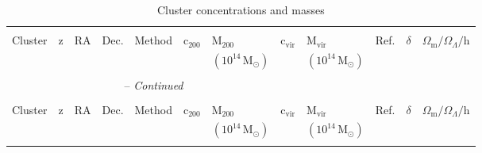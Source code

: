 

\onecolumn
\begin{landscape}
\begin{center}
{\tiny \begin{longtable}{llllllllllll}
\caption{{\normalsize Cluster concentrations and masses}} \\
\hline \hline \\[-2ex]
   \multicolumn{1}{l}{Cluster} &
   \multicolumn{1}{l}{$\mathrm{z}$} &
   \multicolumn{1}{l}{$\mathrm{RA}$} &
   \multicolumn{1}{l}{$\mathrm{Dec.}$} &
   \multicolumn{1}{l}{Method} &
   \multicolumn{1}{l}{$\mathrm{c}_{200}$} &
   \multicolumn{1}{l}{$\mathrm{M}_{200}$} &
   \multicolumn{1}{l}{$\mathrm{c}_\mathrm{vir}$} &
   \multicolumn{1}{l}{$\mathrm{M}_\mathrm{vir}$} &
   \multicolumn{1}{l}{Ref.} &
   \multicolumn{1}{l}{$\delta$} &
   \multicolumn{1}{l}{$\Omega_{\mathrm{m}} / \Omega_{\Lambda} / \mathrm{h}$} \\
                               & & & & & &
\multicolumn{1}{l}{$(10^{14} \, \mathrm{M}_\odot)$} & &
\multicolumn{1}{l}{$(10^{14} \, \mathrm{M}_\odot)$} \\ [0.5ex] \hline
   \\[-1.8ex]
\endfirsthead
\multicolumn{8}{c}{{\tablename} \thetable{} -- {\it Continued}} \\[0.5ex]
  \hline \hline \\[-2ex]
   \multicolumn{1}{l}{Cluster} &
   \multicolumn{1}{l}{$\mathrm{z}$} &
   \multicolumn{1}{l}{$\mathrm{RA}$} &
   \multicolumn{1}{l}{$\mathrm{Dec.}$} &
   \multicolumn{1}{l}{Method} &
   \multicolumn{1}{l}{$\mathrm{c}_{200}$} &
   \multicolumn{1}{l}{$\mathrm{M}_{200}$} &
   \multicolumn{1}{l}{$\mathrm{c}_\mathrm{vir}$} &
   \multicolumn{1}{l}{$\mathrm{M}_\mathrm{vir}$} &
   \multicolumn{1}{l}{Ref.} &
   \multicolumn{1}{l}{$\delta$} &
   \multicolumn{1}{l}{$\Omega_{\mathrm{m}} / \Omega_{\Lambda} / \mathrm{h}$} \\
                               & & & & & &
\multicolumn{1}{l}{$(10^{14} \, \mathrm{M}_\odot)$} & &
\multicolumn{1}{l}{$(10^{14} \, \mathrm{M}_\odot)$} \\[0.5ex] \hline
  \\[-1.8ex]
\endhead

\end{longtable}}
\end{center}
\end{landscape}
